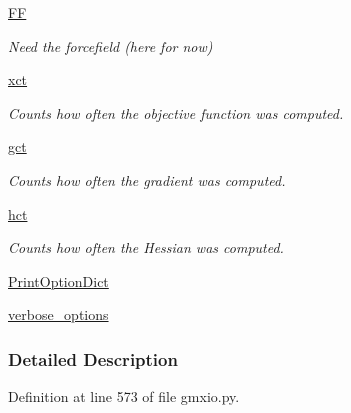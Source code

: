 \begin{DoxyCompactItemize}
\hyperlink{classforcebalance_1_1target_1_1Target_a38a37919783141ea37fdcf8b00ce0aaf}{F\-F}
\begin{DoxyCompactList}\small\item\em Need the forcefield (here for now) \end{DoxyCompactList}\item 
\hyperlink{classforcebalance_1_1target_1_1Target_aad2e385cfbf7b4a68f1c2cb41133fe82}{xct}
\begin{DoxyCompactList}\small\item\em Counts how often the objective function was computed. \end{DoxyCompactList}\item 
\hyperlink{classforcebalance_1_1target_1_1Target_aa625ac88c6744eb14ef281d9496d0dbb}{gct}
\begin{DoxyCompactList}\small\item\em Counts how often the gradient was computed. \end{DoxyCompactList}\item 
\hyperlink{classforcebalance_1_1target_1_1Target_a5b5a42f78052b47f29ed4b940c6111a1}{hct}
\begin{DoxyCompactList}\small\item\em Counts how often the Hessian was computed. \end{DoxyCompactList}\item 
\hyperlink{classforcebalance_1_1BaseClass_afc6659278497d7245bc492ecf405ccae}{Print\-Option\-Dict}
\item 
\hyperlink{classforcebalance_1_1BaseClass_afd68efa29ccd2f320f4cf82198214aac}{verbose\-\_\-options}
\end{DoxyCompactItemize}


\subsubsection{Detailed Description}


Definition at line 573 of file gmxio.\-py.



